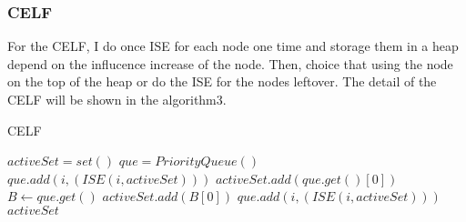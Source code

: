 \documentclass[conference,compsoc]{IEEEtran}
\begin{document}
    \subsubsection{CELF}
      For the CELF, I do once ISE for each node one time and storage them in a heap depend on the influcence increase of the node.
      Then, choice that using the node on the top of the heap or do the ISE for the nodes leftover.
      The detail of the CELF will be shown in the algorithm3.
      \begin{algorithm}
        \caption{CELF}
        \begin{algorithmic}[1]
            \State $activeSet = set()$
            \State $que = PriorityQueue()$
              \State $que.add(i, (ISE(i, activeSet)))$
            \EndFor
            \State $activeSet.add(que.get()[0])$
              \State $B\gets que.get()$
                \State $activeSet.add(B[0])$
              \Else
                    \State $que.add(i, (ISE(i, activeSet)))$
                  \EndIf
                \EndFor
              \EndIf
            \EndWhile
            \State \Return $activeSet$
          \EndFunction
        \end{algorithmic}
      \end{algorithm}
\end{document}
